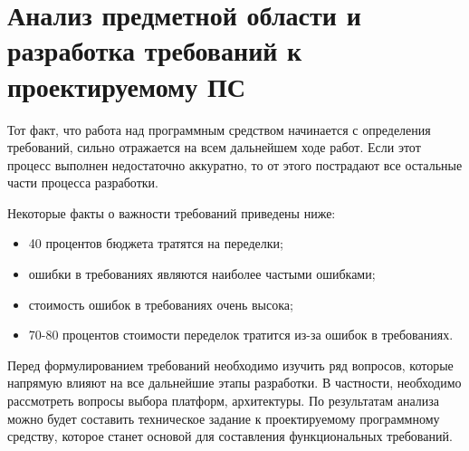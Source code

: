 \section{Анализ предметной области и разработка требований к проектируемому ПС}
\label{sec:analysis}

Тот факт, что работа над программным средством начинается с определения требований, сильно отражается на всем дальнейшем ходе работ. Если этот процесс выполнен недостаточно аккуратно, то от этого пострадают все остальные части процесса разработки.

Некоторые факты о важности требований приведены ниже:
\begin{itemize}
	\item 40 процентов бюджета тратятся на переделки;
	\item ошибки в требованиях являются наиболее частыми ошибками;
	\item стоимость ошибок в требованиях очень высока;
	\item 70-80 процентов стоимости переделок тратится из-за ошибок в требованиях.
\end{itemize}

Перед формулированием требований необходимо изучить ряд вопросов, которые напрямую влияют на все дальнейшие этапы разработки. В частности, необходимо рассмотреть вопросы выбора платформ, архитектуры. По результатам анализа можно будет составить техническое задание к проектируемому программному средству, которое станет основой для составления функциональных требований.





